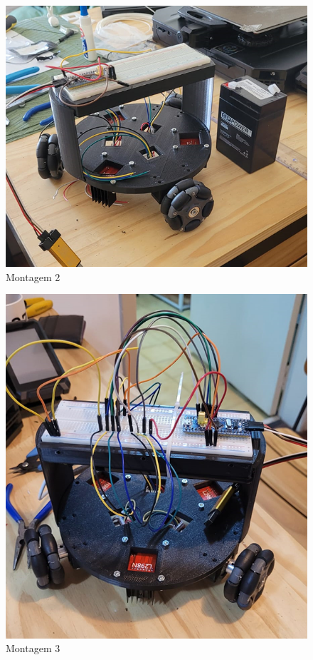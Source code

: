 \begin{figure}[h]
	\centering
	\includegraphics{figures/montagem_2}
	\caption{Montagem 2}
	\label{fig:montagem_2}
\end{figure}

\begin{figure}[h]
	\centering
	\includegraphics{figures/montagem_3}
	\caption{Montagem 3}
	\label{fig:montagem_3}
\end{figure}


